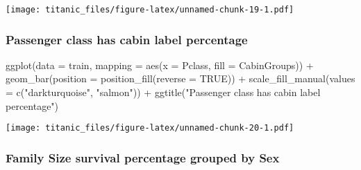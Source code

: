 \documentclass[
]{article}
\newenvironment{Shaded}{\begin{snugshade}}{\end{snugshade}}
\newcommand{\AttributeTok}[1]{\textcolor[rgb]{0.77,0.63,0.00}{#1}}
\newcommand{\ConstantTok}[1]{\textcolor[rgb]{0.00,0.00,0.00}{#1}}
\newcommand{\FunctionTok}[1]{\textcolor[rgb]{0.00,0.00,0.00}{#1}}
\newcommand{\NormalTok}[1]{#1}
\newcommand{\SpecialCharTok}[1]{\textcolor[rgb]{0.00,0.00,0.00}{#1}}
\newcommand{\StringTok}[1]{\textcolor[rgb]{0.31,0.60,0.02}{#1}}
\begin{document}
\texttt{[image: titanic\_files/figure-latex/unnamed-chunk-19-1.pdf]}

\hypertarget{passenger-class-has-cabin-label-percentage}{%
\subsubsection{Passenger class has cabin label
percentage}\label{passenger-class-has-cabin-label-percentage}}

\begin{Shaded}
\begin{Highlighting}[]
\FunctionTok{ggplot}\NormalTok{(}\AttributeTok{data =}\NormalTok{ train, }\AttributeTok{mapping =} \FunctionTok{aes}\NormalTok{(}\AttributeTok{x =}\NormalTok{ Pclass, }\AttributeTok{fill =}\NormalTok{ CabinGroups)) }\SpecialCharTok{+}
  \FunctionTok{geom\_bar}\NormalTok{(}\AttributeTok{position =} \FunctionTok{position\_fill}\NormalTok{(}\AttributeTok{reverse =} \ConstantTok{TRUE}\NormalTok{)) }\SpecialCharTok{+}
  \FunctionTok{scale\_fill\_manual}\NormalTok{(}\AttributeTok{values =} \FunctionTok{c}\NormalTok{(}\StringTok{"darkturquoise"}\NormalTok{,}
                               \StringTok{"salmon"}\NormalTok{)) }\SpecialCharTok{+}
  \FunctionTok{ggtitle}\NormalTok{(}\StringTok{"Passenger class has cabin label percentage"}\NormalTok{)}
\end{Highlighting}
\end{Shaded}

\texttt{[image: titanic\_files/figure-latex/unnamed-chunk-20-1.pdf]}

\hypertarget{family-size-survival-percentage-grouped-by-sex}{%
\subsubsection{Family Size survival percentage grouped by
Sex}\label{family-size-survival-percentage-grouped-by-sex}}

\begin{Shaded}
\end{Shaded}
\end{document}
